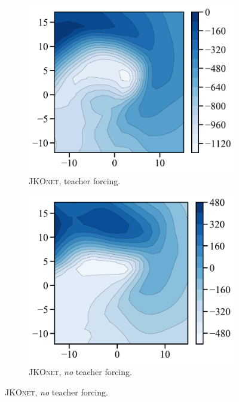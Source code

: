 \begin{figure}[t]
\begin{subfigure}[t]{0.24\textwidth}
     \end{subfigure}
     \hfill
     \begin{subfigure}[t]{0.24\textwidth}
         \centering
         \caption{\textsc{JKOnet}, \protect\newline teacher forcing.}
         \includegraphics[width=\textwidth]{figures/fig_energy_implicit_spiral_tf.pdf}
     \end{subfigure}
     \hfill
     \begin{subfigure}[t]{0.24\textwidth}
         \centering
         \caption{\textsc{JKOnet}, \protect\newline \emph{no} teacher forcing.}
         \includegraphics[width=\textwidth]{figures/fig_energy_implicit_spiral.pdf}

\end{subfigure}
\end{figure}
